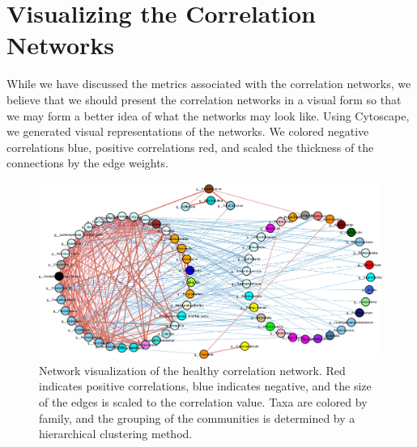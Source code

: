 \section{Visualizing the Correlation Networks}\label{res-viz}
While we have discussed the metrics associated with the correlation networks, we believe that we should present the correlation networks in a visual form so that we may form a better idea of what the networks may look like. Using Cytoscape, we generated visual representations of the networks. We colored negative correlations blue, positive correlations red, and scaled the thickness of the connections by the edge weights. 

\begin{figure}[!thbp]
    \centering
    \includegraphics[width=1.0\linewidth]{figure/results/healthy_net.png}
    \caption[Network visualization of the healthy correlation network.]{Network visualization of the healthy correlation network. Red indicates positive correlations, blue indicates negative, and the size of the edges is scaled to the correlation value. Taxa are colored by family, and the grouping of the communities is determined by a hierarchical clustering method.}
    \label{fig:healthy-net}
\end{figure}

